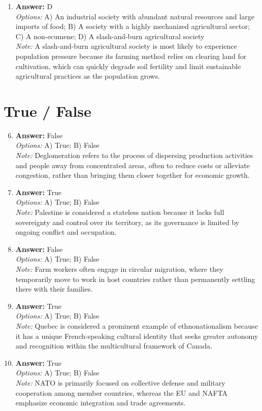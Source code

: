 \documentclass[12pt]{article}
\begin{document}
\begin{enumerate}[label=\arabic*.]
\item \textbf{Answer:} D
\\ \textit{Options:} A) An industrial society with abundant natural resources and large imports of food; B) A society with a highly mechanized agricultural sector; C) A non-ecumene; D) A slash-and-burn agricultural society
\\ \textit{Note:} A slash-and-burn agricultural society is most likely to experience population pressure because its farming method relies on clearing land for cultivation, which can quickly degrade soil fertility and limit sustainable agricultural practices as the population grows.
\end{enumerate}

\section*{True / False}
\begin{enumerate}[label=\arabic*.]
\setcounter{enumi}{5}
\item \textbf{Answer:} False
\\ \textit{Options:} A) True; B) False
\\ \textit{Note:} Deglomeration refers to the process of dispersing production activities and people away from concentrated areas, often to reduce costs or alleviate congestion, rather than bringing them closer together for economic growth.
\item \textbf{Answer:} True
\\ \textit{Options:} A) True; B) False
\\ \textit{Note:} Palestine is considered a stateless nation because it lacks full sovereignty and control over its territory, as its governance is limited by ongoing conflict and occupation.
\item \textbf{Answer:} False
\\ \textit{Options:} A) True; B) False
\\ \textit{Note:} Farm workers often engage in circular migration, where they temporarily move to work in host countries rather than permanently settling there with their families.
\item \textbf{Answer:} True
\\ \textit{Options:} A) True; B) False
\\ \textit{Note:} Quebec is considered a prominent example of ethnonationalism because it has a unique French-speaking cultural identity that seeks greater autonomy and recognition within the multicultural framework of Canada.
\item \textbf{Answer:} True
\\ \textit{Options:} A) True; B) False
\\ \textit{Note:} NATO is primarily focused on collective defense and military cooperation among member countries, whereas the EU and NAFTA emphasize economic integration and trade agreements.
\end{enumerate}
\end{document}
